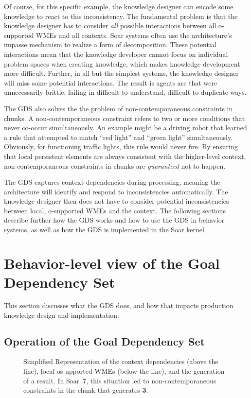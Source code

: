 Of course, for this specific example, the knowledge designer can
encode some knowledge to react to this inconsistency.  The fundamental
problem is that the knowledge designer has to consider \emph{all}
possible interactions between all o-supported WMEs and all contexts.
Soar systems often use the architecture's impasse mechanism to realize
a form of decomposition.  These potential interactions mean that the
knowledge developer cannot focus on individual problem spaces when
creating knowledge, which makes knowledge development more difficult.
Further, in all but the simplest systems, the knowledge designer will
miss some potential interactions.  The result is agents are that were
unnecessarily brittle, failing in difficult-to-understand,
difficult-to-duplicate ways.  

The GDS also solves the the problem of non-contemporaneous constraints
in chunks.  A non-contemporaneous constraint refers to two or more
conditions that never co-occur simultaneously.  An example might be a
driving robot that learned a rule that attempted to match ``red
light'' and ``green light'' simultaneously. Obviously, for functioning
traffic lights, this rule would never fire.  By ensuring that local
persistent elements are always consistent with the higher-level
context, non-contemporaneous constraints in chunks are
\emph{guaranteed} not to happen.


The GDS captures context dependencies during processing, meaning the
architecture will identify and respond to inconsistencies
automatically.  The knowledge designer then does not have to consider
potential inconsistencies between local, o-supported WMEs and the
context.  The following sections describe further how the GDS works
and how to use the GDS in behavior systems, as well as how the GDS is
implemented in the Soar kernel.


\section*{Behavior-level view of the Goal Dependency Set}

This section discusses what the GDS does, and how that impacts
production knowledge design and implementation.

\subsection*{Operation of the Goal Dependency Set}


\begin{figure}
\caption{Simplified Representation of the context dependencies (above the line), local os-upported WMEs (below the line), and the generation of a result.  In Soar~7, this situation led to non-contemporaneous constraints in the chunk that generates {\bf 3}.}
\label{'ncc'}
\end{figure}

